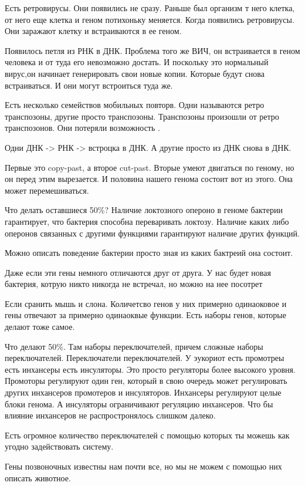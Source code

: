 Есть ретровирусы. Они появились не сразу. Раньше 
был организм т него клетка, 
от него еще клетка и геном потихоньку меняется. Когда 
появились ретровирусы. Они заражают клетку и встраиваются в ее геном. 

Появилось петля из РНК в ДНК. Проблема того же ВИЧ, он встраивается 
в геном человека и от туда его невозможно достать. И поскольку это нормальный 
вирус,он начинает генерировать свои новые копии. Которые будут снова встраиваться. 
И они могут встроиться туда же. 

Есть несколько семействов мобильных повторв. Одни называются ретро транспозоны, 
другие просто транспозоны. Транспозоны произошли от 
ретро транспозонов. Они потеряли возможность . 

Одни ДНК -> РНК -> встроцка в ДНК. 
А другие просто из ДНК снова в ДНК. 

Первые это copy-past, а второе cut-past. 
Вторые умеют двигаться по геному, но он перед этим вырезается. И половина
нашего генома состоит вот из этого. Она может перемешиваться. 

Что делать оставшиеся 50\%? Наличие локтозного опероно в геноме
бактерии гарантирует, что бактерия способна переваривать 
локтозу. Наличие каких либо оперонов 
связанных с другими функциями гарантируют 
наличие других функций. 

Можно описать поведение бактерии просто 
зная из каких бактреий она состоит. 

Даже если эти гены немного отличаются друг от друга. 
У нас будет новая бактерия, котрую никто никогда не встречал, 
но можно на нее посотрет

Если сранить мышь и слона. Количетсво генов у них примерно одинаоковое и 
гены отвечают за примерно одинаоквые функции. Есть наборы генов, 
которые делают тоже самое. 

Что делают 50\%. Там наборы переключателей, причем 
сложные наборы переключателей. Переключатели переключателей. 
У эукориот есть промотреы есть инхансеры есть инсуляторы. 
Это просто регуляторы более высокого уровня. Промоторы регулируют один ген, 
который в свою очередь может регулировать других инхансеров промотеров и 
инсуляторов. Инхансеры регулируют целые блоки генома. А инсуляторы ограничивают регуляцию 
инхансеров. Что бы влияние инхансеров не распростронялось слишком далеко.

Есть огромное количество переключателей с помощью которых ты можешь как угодно
задействовать систему.

Гены позвоночных известны нам почти все, но мы не можем
с помощью них описать животное.

